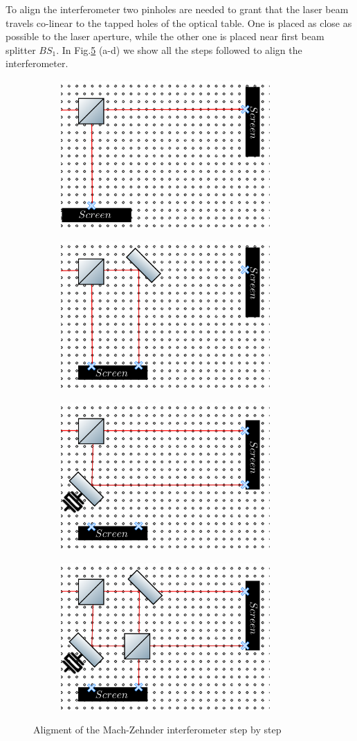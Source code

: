 \documentclass[12pt]{book}
\begin{document}
To align the interferometer two pinholes are needed to grant that the laser beam travels co-linear to the tapped holes of the optical table. One is placed as close as possible to the laser aperture, while the other one is placed near first beam splitter $BS_{1}$. In Fig.\ref{steps} (a-d) we show all the steps followed to align the interferometer.

\begin{figure}[t!]
\centering
\begin{subfigure}[b]{0.55\linewidth}
\includegraphics[width=8cm,height=4 cm]{images/first_step.png}
\caption{}
\label{fig:BS1}
\end{subfigure}
\begin{subfigure}[b]{0.55\linewidth}
\includegraphics[width=8cm,height=4 cm]{images/second_step.png}
\caption{}
\label{fig:BS1}
\end{subfigure}
\begin{subfigure}[b]{0.55\linewidth}
\includegraphics[width=8cm,height=4 cm]{images/third_step.png}
\caption{}
\label{fig:BS1}
\end{subfigure}
\begin{subfigure}[b]{0.55\linewidth}
\includegraphics[width=8cm,height=4 cm]{images/last_step.png}
\caption{}
\label{fig:westminster_aerea}
\end{subfigure}
\caption{Aligment of the Mach-Zehnder interferometer step by step}
\label{steps}
\end{figure}
\end{document}
